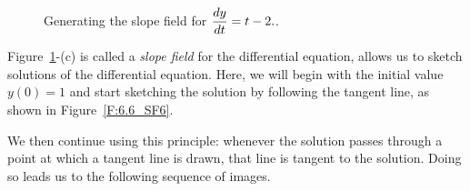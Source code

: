 \begin{figure}
\begin{flushright}
\end{flushright}
\caption{Generating the slope field for $\displaystyle \frac{dy}{dt} = t-2.$.}
\label{F:6.6_SF2}
\end{figure}

Figure~\ref{F:6.6_SF2}-(c) is called a {\em slope field} for the differential equation, allows us to sketch solutions of the differential equation.  Here, we will begin with the initial value $y(0) = 1$ and start sketching the solution by following the tangent line, as shown in Figure~\ref{F:6.6_SF6}.


We then continue using this principle:  whenever the solution passes through a point at which a tangent line is drawn, that line is tangent to the solution.  Doing so leads us to the following sequence of images.

